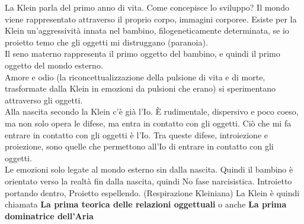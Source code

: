 \documentclass[
]{article}
\begin{document}
La Klein parla del primo anno di vita. Come concepisce lo sviluppo? Il
mondo viene rappresentato attraverso il proprio corpo, immagini
corporee. Esiste per la Klein un'aggressività innata nel bambino,
filogeneticamente determinata, se io proietto temo che gli oggetti mi
distruggano (paranoia).\\
Il seno materno rappresenta il primo oggetto del bambino, e quindi il
primo oggetto del mondo esterno.\\
Amore e odio (la riconcettualizzazione della pulsione di vita e di
morte, trasformate dalla Klein in emozioni da pulsioni che erano) si
sperimentano attraverso gli oggetti.\\
Alla nascita secondo la Klein c'è già l'Io. È rudimentale, dispersivo e
poco coeso, ma non solo opera le difese, ma entra in contatto con gli
oggetti. Ciò che mi fa entrare in contatto con gli oggetti è l'Io. Tra
queste difese, introiezione e proiezione, sono quelle che permettono
all'Io di entrare in contatto con gli oggetti.\\
Le emozioni solo legate al mondo esterno sin dalla nascita. Quindi il
bambino è orientato verso la realtà fin dalla nascita, quindi No fase
narcisistica. Introietto portando dentro, Proietto espellendo.
(Respirazione Kleiniana) La Klein è quindi chiamata \textbf{La prima
teorica delle relazioni oggettuali} o anche \textbf{La prima dominatrice
dell'Aria}
\end{document}
